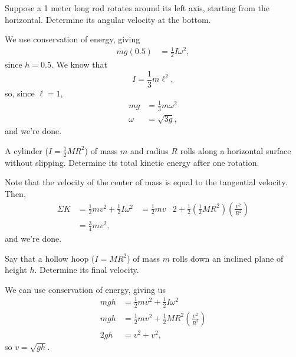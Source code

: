 \documentclass[11pt]{article}
\begin{document}
\begin{example}
	Suppose a 1 meter long rod rotates around its left axis, starting from the horizontal. Determine its angular velocity at the bottom.
\end{example}
\begin{solution}
	We use conservation of energy, giving
	\begin{align*}
		mg(0.5) &= \frac{1}{2}I\omega^2,
	\end{align*}
	since $h = 0.5$. We know that
	\[I = \frac{1}{3}m\ell^2,\]
	so, since $\ell = 1$,
	\begin{align*}
		mg &= \frac{1}{3}m\omega^2 \\
		\omega &= \boxed{\sqrt{3g}},
	\end{align*}
	and we're done.
\end{solution}

\begin{example}
	A cylinder ($I= \frac{1}{2}MR^2$) of mass $m$ and radius $R$ rolls along a horizontal surface without slipping. Determine its total kinetic energy after one rotation.
\end{example}
\begin{solution}
	Note that the velocity of the center of mass is equal to the tangential velocity. Then,
	\begin{align*}
		\Sigma K &= \frac{1}{2}mv^2 + \frac{1}{2}I\omega^2
		&= \frac{1}{2}mv&2 + \frac{1}{2}\left(\frac{1}{2}MR^2\right)\left(\frac{v^2}{R^2}\right) \\
		&= \boxed{\frac{3}{4}mv^2},
	\end{align*}
	and we're done.
\end{solution}

\begin{example}
	Say that a hollow hoop ($I = MR^2$) of mass $m$ rolls down an inclined plane of height $h$. Determine its final velocity.
\end{example}
\begin{solution}
	We can use conservation of energy, giving us
	\begin{align*}
		mgh &= \frac{1}{2}mv^2 + \frac{1}{2}I\omega^2 \\
		mgh &= \frac{1}{2}mv^2 + \frac{1}{2}MR^2\left(\frac{v^2}{R^2}\right) \\
		2gh &= v^2 + v^2,
	\end{align*}
	so $v = \boxed{\sqrt{gh}}$.
\end{solution}
\end{document}
